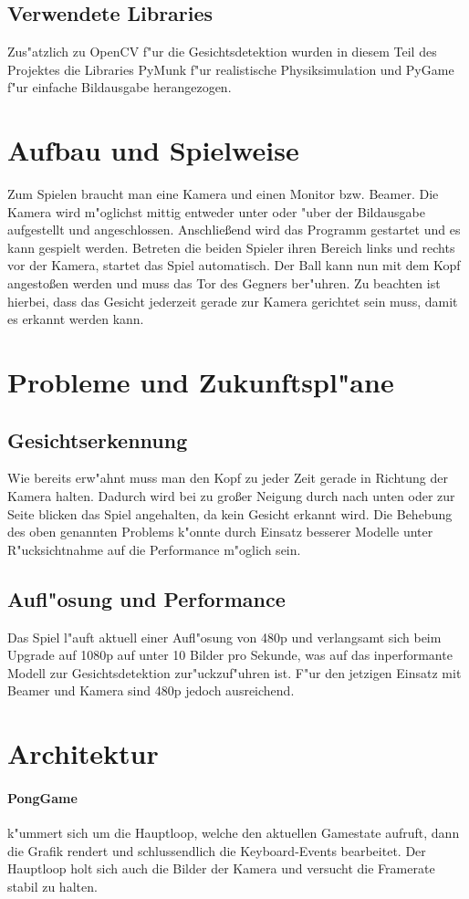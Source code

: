 \documentclass[12pt]{article}
\begin{document}
\subsection{Verwendete Libraries}
Zus"atzlich zu OpenCV f"ur die Gesichtsdetektion wurden in diesem Teil des Projektes
die Libraries PyMunk f"ur realistische Physiksimulation und PyGame f"ur einfache Bildausgabe
herangezogen.
\section{Aufbau und Spielweise}
Zum Spielen braucht man eine Kamera und einen Monitor bzw. Beamer. Die Kamera
wird m"oglichst mittig entweder unter oder "uber der Bildausgabe aufgestellt und angeschlossen.
Anschlie{\ss}end wird das Programm gestartet und es kann gespielt werden.
Betreten die beiden Spieler ihren Bereich links und rechts vor der Kamera,
startet das Spiel automatisch. Der Ball kann nun mit dem Kopf angesto{\ss}en werden
und muss das Tor des Gegners ber"uhren. Zu beachten ist hierbei, dass
das Gesicht jederzeit gerade zur Kamera gerichtet sein muss, damit es erkannt werden kann.
\section{Probleme und Zukunftspl"ane}
\subsection{Gesichtserkennung}
Wie bereits erw"ahnt muss man den Kopf zu jeder Zeit gerade in Richtung
der Kamera halten. Dadurch wird bei zu gro{\ss}er Neigung durch nach unten oder zur
Seite blicken das Spiel angehalten, da kein Gesicht erkannt wird.
Die Behebung des oben genannten Problems k"onnte durch Einsatz besserer
Modelle unter R"ucksichtnahme auf die Performance m"oglich sein.
\subsection{Aufl"osung und Performance}
Das Spiel l"auft aktuell einer Aufl"osung von 480p und verlangsamt sich beim Upgrade auf 1080p
auf unter 10 Bilder pro Sekunde, was auf das inperformante Modell zur
Gesichtsdetektion zur"uckzuf"uhren ist. F"ur den jetzigen Einsatz mit
Beamer und Kamera sind 480p jedoch ausreichend.
\section{Architektur}
\paragraph{PongGame}
k"ummert sich um die Hauptloop, welche den aktuellen Gamestate aufruft, dann die 
Grafik rendert und schlussendlich die Keyboard-Events bearbeitet.
Der Hauptloop holt sich auch die Bilder der Kamera und versucht die Framerate 
stabil zu halten.
\end{document}
